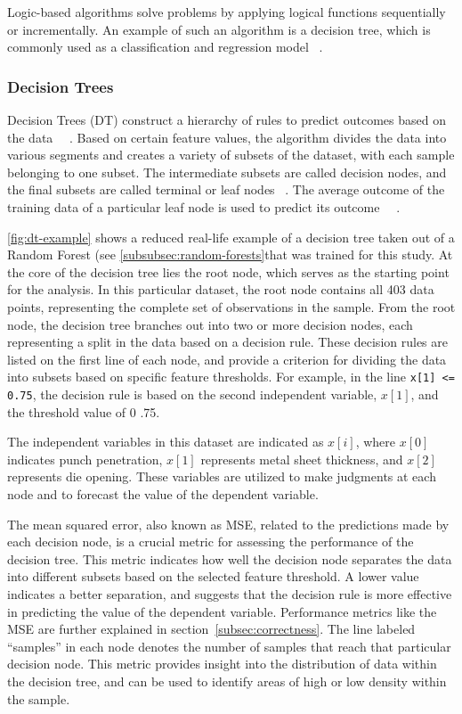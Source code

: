 Logic-based algorithms solve problems by applying logical functions sequentially or
incrementally.
An example of such an algorithm is a decision tree, which is commonly used as a classification
and regression model
~\cite[p. 10]{dridi2021supervised}.

\subsubsection{Decision Trees}
Decision Trees (DT) construct a hierarchy of rules to predict outcomes based on the
data
~\cite[p. 70]{muller_introductionmachinelearning_2016}~\cite[p. 253]{shaik_briefsurveyrandom_2019}.
Based on certain feature values, the algorithm divides the data into various segments and creates a variety of
subsets of the dataset, with each sample belonging to one subset.
The intermediate subsets are called decision nodes, and the final subsets are called terminal or leaf nodes
~\cite[p. 358]{geron2022hands}.
The average outcome of the training data of a particular leaf node is used to predict its
outcome~
~\cite[p. 70--72]{muller_introductionmachinelearning_2016}.

\cref{fig:dt-example} shows a reduced real-life example of a decision tree taken out of a Random Forest
(see \cref{subsubsec:random-forests}that was trained for this study.
At the core of the decision tree lies the root node, which serves as the starting point for the analysis.
In this particular dataset, the root node contains all 403 data points, representing the complete set of observations
in the sample.
From the root node, the decision tree branches out into two or more decision nodes, each representing a split in the
data based on a decision rule.
These decision rules are listed on the first line of each node, and provide a criterion for dividing the data into
subsets based on specific feature thresholds.
For example, in the line \texttt{x[1] <= 0.75}, the decision rule is based on the second independent variable,
$x[1]$, and the threshold value of 0 .75.

The independent variables in this dataset are indicated as $x[i]$, where $x[0]$ indicates punch penetration, $x[1]$
represents metal sheet thickness, and $x[2]$ represents die opening.
These variables are utilized to make judgments at each node and to forecast the value of the dependent variable.

The mean squared error, also known as MSE, related to the predictions made by each decision node, is a crucial metric
for assessing the performance of the decision tree.
This metric indicates how well the decision node separates the data into different subsets based on the selected
feature threshold.
A lower value indicates a better separation, and suggests that the decision rule is more effective in predicting the
value of the dependent variable.
Performance metrics like the \ac{MSE} are further explained in section~\ref{subsec:correctness}.
The line labeled ``samples'' in each node denotes the number of samples that reach that particular decision node.
This metric provides insight into the distribution of data within the decision tree, and can be used to identify
areas of high or low density within the sample.

